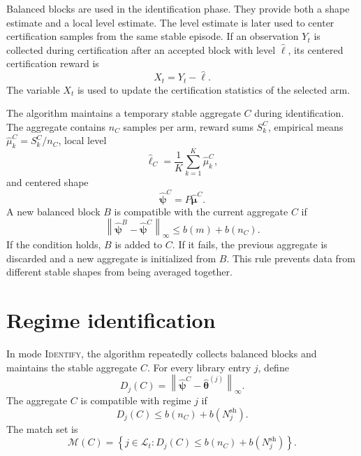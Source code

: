 \documentclass[11pt]{article}
\newcommand{\Lcal}{\mathcal L}
\newcommand{\norm}[1]{\left\lVert #1 \right\rVert}
\newcommand{\ID}{\textsc{Identify}\xspace}
\begin{document}
Balanced blocks are used in the identification phase. They provide both a shape estimate and a local level estimate. The level estimate is later used to center certification samples from the same stable episode. If an observation $Y_t$ is collected during certification after an accepted block with level $\widehat\ell$, its centered certification reward is
\begin{equation}
    X_t=Y_t-\widehat\ell.
    \label{eq:centered-cert-reward}
\end{equation}
The variable $X_t$ is used to update the certification statistics of the selected arm.

The algorithm maintains a temporary stable aggregate $C$ during identification. The aggregate contains $n_C$ samples per arm, reward sums $S_k^C$, empirical means $\widehat\mu_k^C=S_k^C/n_C$, local level
\begin{equation}
    \widehat\ell_C=\frac{1}{K}\sum_{k=1}^K\widehat\mu_k^C,
\end{equation}
and centered shape
\begin{equation}
    \widehat{\bm\psi}^C=P\widehat{\bm\mu}^C.
\end{equation}
A new balanced block $B$ is compatible with the current aggregate $C$ if
\begin{equation}
    \norm{\widehat{\bm\psi}^{B}-\widehat{\bm\psi}^{C}}_\infty
    \leq
    b(m)+b(n_C).
    \label{eq:stable-block}
\end{equation}
If the condition holds, $B$ is added to $C$. If it fails, the previous aggregate is discarded and a new aggregate is initialized from $B$. This rule prevents data from different stable shapes from being averaged together.

\section{Regime identification}

In mode \ID, the algorithm repeatedly collects balanced blocks and maintains the stable aggregate $C$. For every library entry $j$, define
\begin{equation}
    D_j(C)=\norm{\widehat{\bm\psi}^{C}-\widehat{\bm\theta}^{(j)}}_\infty.
    \label{eq:distance}
\end{equation}
The aggregate $C$ is compatible with regime $j$ if
\begin{equation}
    D_j(C)\leq b(n_C)+b(N_j^{\mathrm{sh}}).
    \label{eq:compatible-regime}
\end{equation}
The match set is
\begin{equation}
    \mathcal M(C)=
    \left\{j\in\Lcal_t:
    D_j(C)\leq b(n_C)+b(N_j^{\mathrm{sh}})
    \right\}.
    \label{eq:match-set}
\end{equation}
\end{document}
